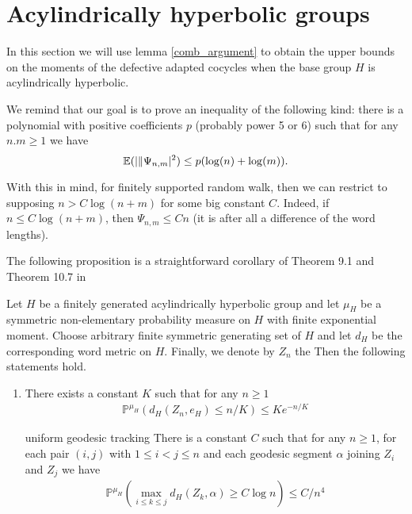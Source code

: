 \section{Acylindrically hyperbolic groups}

In this section we will use lemma \ref{comb_argument} to obtain the upper bounds on the moments of the defective adapted cocycles when the base group $H$ is acylindrically hyperbolic. 

We remind that our goal is to prove an inequality of the following kind: there is a polynomial with positive coefficients $p$ (probably power 5 or 6) such that for any $n.m\ge 1$ we have
\[
\mathbb{E}(|\|\Psi_{n,m}|^2)\le p(\log(n)+\log(m)).
\]

With this in mind, for finitely supported random walk, then we can restrict to supposing $n>C\log(n+m)$ for some big constant $C$. Indeed, if $n\le C\log(n+m)$, then  $\Psi_{n,m}\le C n$ (it is after all a difference of the word lengths).



The following proposition is a straightforward corollary of Theorem 9.1 and Theorem 10.7 in \cite{MathieuSisto2020}

\begin{prop}\label{prop: tracking}
Let $H$ be a finitely generated acylindrically hyperbolic group and let $\mu_H$ be a symmetric non-elementary probability measure on $H$ with finite exponential moment.  Choose arbitrary finite symmetric generating set of $H$ and let $d_H$ be the corresponding  word metric on $H$.  Finally, we denote by $Z_n$ the Then the following statements hold.


\begin{enumerate}
    \item There exists a constant $K$ such that  for any $n \geq 1$
    \begin{align*}
      \mathbb{P}^{\mu_H} \left( d_H(Z_n,e_H) \leq n/K \right) \leq Ke^{-n/K}
    \end{align*}
    \item [uniform geodesic tracking] There is a constant $C$ such that for any $n \geq 1$, for each pair $(i,j)$ with $1 \leq i < j \leq n $  and each geodesic segment $\alpha$ joining $Z_i$ and $Z_j$ we have
    \begin{align*}
      \mathbb{P}^{\mu_H} \left( \max_{ i\leq k \leq j} d_H(Z_k,\alpha) \geq C \log n \right) \leq C/n^4
    \end{align*}
\end{enumerate}
\end{prop}

